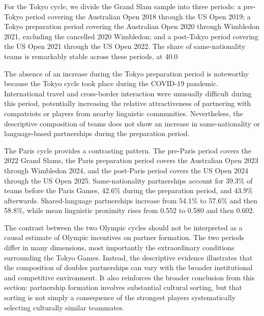 \documentclass[10pt]{article}
\begin{document}
For the Tokyo cycle, we divide the Grand Slam sample into three periods: a pre-Tokyo period covering the Australian Open 2018 through the US Open 2019; a Tokyo preparation period covering the Australian Open 2020 through Wimbledon 2021, excluding the cancelled 2020 Wimbledon; and a post-Tokyo period covering the US Open 2021 through the US Open 2022. The share of same-nationality teams is remarkably stable across these periods, at 40.0%

The absence of an increase during the Tokyo preparation period is noteworthy because the Tokyo cycle took place during the COVID-19 pandemic. International travel and cross-border interaction were unusually difficult during this period, potentially increasing the relative attractiveness of partnering with compatriots or players from nearby linguistic communities. Nevertheless, the descriptive composition of teams does not show an increase in same-nationality or language-based partnerships during the preparation period.

The Paris cycle provides a contrasting pattern. The pre-Paris period covers the 2022 Grand Slams, the Paris preparation period covers the Australian Open 2023 through Wimbledon 2024, and the post-Paris period covers the US Open 2024 through the US Open 2025. Same-nationality partnerships account for 39.3\% of teams before the Paris Games, 42.6\% during the preparation period, and 43.9\% afterwards. Shared-language partnerships increase from 54.1\% to 57.6\% and then 58.8\%, while mean linguistic proximity rises from 0.552 to 0.580 and then 0.602.

The contrast between the two Olympic cycles should not be interpreted as a causal estimate of Olympic incentives on partner formation. The two periods differ in many dimensions, most importantly the extraordinary conditions surrounding the Tokyo Games. Instead, the descriptive evidence illustrates that the composition of doubles partnerships can vary with the broader institutional and competitive environment. It also reinforces the broader conclusion from this section: partnership formation involves substantial cultural sorting, but that sorting is not simply a consequence of the strongest players systematically selecting culturally similar teammates.
\end{document}
